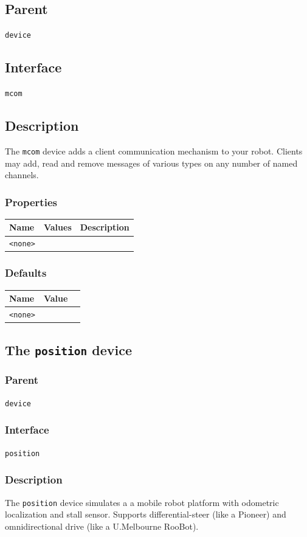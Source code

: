 \documentclass[11pt,twoside]{report}
\begin{document}
\subsection*{Parent}
{\tt device}

\subsection*{Interface}
{\tt mcom}

\subsection*{Description}
The {\tt mcom} device adds a client communication mechanism to your robot.
Clients may add, read and remove messages of various types on any number
of named channels.

\subsubsection*{Properties}
\begin{tabularx}{\columnwidth}{llX}
\hline
Name & Values & Description \\
\hline
\verb'<none>'\\
\hline
\end{tabularx}

\subsubsection*{Defaults}
\begin{tabularx}{\columnwidth}{llX}
\hline
Name & Value\\
\hline
\verb'<none>'\\
\hline
\end{tabularx}


\newpage
\subsection{The {\tt position} device}

\subsubsection*{Parent}
{\tt device}

\subsubsection*{Interface}
{\tt position}

\subsubsection*{Description}
The {\tt position} device simulates a a mobile robot platform with
odometric localization and stall sensor. Supports differential-steer
(like a Pioneer) and omnidirectional drive (like a U.Melbourne
RooBot).
\end{document}
